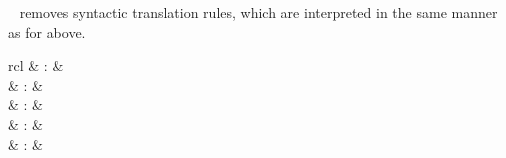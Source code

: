 \begin{isabellebody}
\begin{isamarkuptext}
\begin{description}
  \item \hyperlink{command.no-translations}{\mbox{}}~ removes syntactic
  translation rules, which are interpreted in the same manner as for
  \hyperlink{command.translations}{\mbox{}} above.

  \end{description}%
\end{isamarkuptext}%
\isamarkuptrue%
%
\isamarkuptrue%
%
\begin{isamarkuptext}%
\begin{matharray}{rcl}
    \hypertarget{command.parse-ast-translation}{\hyperlink{command.parse-ast-translation}{\mbox{}}} & : &  \\
    \hypertarget{command.parse-translation}{\hyperlink{command.parse-translation}{\mbox{}}} & : &  \\
    \hypertarget{command.print-translation}{\hyperlink{command.print-translation}{\mbox{}}} & : &  \\
    \hypertarget{command.typed-print-translation}{\hyperlink{command.typed-print-translation}{\mbox{}}} & : &  \\
    \hypertarget{command.print-ast-translation}{\hyperlink{command.print-ast-translation}{\mbox{}}} & : &  \\
  \end{matharray}


\end{isamarkuptext}
\end{isabellebody}
